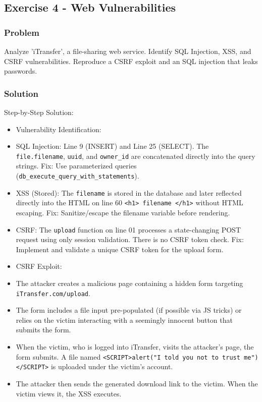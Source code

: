 \documentclass{article}
\begin{document}
\subsection{Exercise 4 - Web Vulnerabilities}
\subsubsection*{Problem}
Analyze 'iTransfer', a file-sharing web service. Identify SQL Injection, XSS, and CSRF vulnerabilities. Reproduce a CSRF exploit and an SQL injection that leaks passwords.

\subsubsection*{Solution}
Step-by-Step Solution:

\begin{itemize}
    \item[\textbf{1.}] Vulnerability Identification:
    \item SQL Injection: Line 9 (INSERT) and Line 25 (SELECT). The \texttt{file.filename}, \texttt{uuid}, and \texttt{owner\_id} are concatenated directly into the query strings. Fix: Use parameterized queries (\texttt{db\_execute\_query\_with\_statements}).
    \item XSS (Stored): The \texttt{filename} is stored in the database and later reflected directly into the HTML on line 60 \texttt{<h1>{{ filename }}</h1>} without HTML escaping. Fix: Sanitize/escape the filename variable before rendering.
    \item CSRF: The \texttt{upload} function on line 01 processes a state-changing POST request using only session validation. There is no CSRF token check. Fix: Implement and validate a unique CSRF token for the upload form.

    \item[\textbf{2.}] CSRF Exploit:
    \item The attacker creates a malicious page containing a hidden form targeting \texttt{iTransfer.com/upload}.
    \item The form includes a file input pre-populated (if possible via JS tricks) or relies on the victim interacting with a seemingly innocent button that submits the form.
    \item When the victim, who is logged into iTransfer, visits the attacker's page, the form submits. A file named \texttt{<SCRIPT>alert("I told you not to trust me")</SCRIPT>} is uploaded under the victim's account.
    \item The attacker then sends the generated download link to the victim. When the victim views it, the XSS executes.


\end{itemize}
\end{document}
